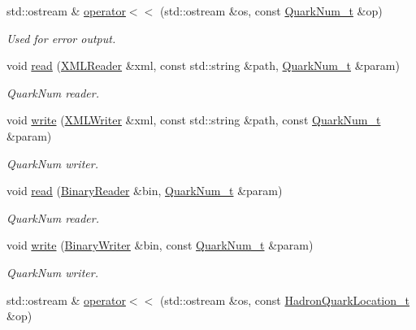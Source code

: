 \begin{DoxyCompactItemize}
\item 
std\+::ostream \& \mbox{\hyperlink{namespaceHadron_a99d886a5455746fba4c549c7a072c731}{operator$<$$<$}} (std\+::ostream \&os, const \mbox{\hyperlink{structHadron_1_1QuarkNum__t}{Quark\+Num\+\_\+t}} \&op)
\begin{DoxyCompactList}\small\item\em Used for error output. \end{DoxyCompactList}\item 
void \mbox{\hyperlink{namespaceHadron_a9fc0b61edf5216d1720dabf68810d3b5}{read}} (\mbox{\hyperlink{classADATXML_1_1XMLReader}{X\+M\+L\+Reader}} \&xml, const std\+::string \&path, \mbox{\hyperlink{structHadron_1_1QuarkNum__t}{Quark\+Num\+\_\+t}} \&param)
\begin{DoxyCompactList}\small\item\em Quark\+Num reader. \end{DoxyCompactList}\item 
void \mbox{\hyperlink{namespaceHadron_a7da51caa70247c9ab9d11f8275ec93b7}{write}} (\mbox{\hyperlink{classADATXML_1_1XMLWriter}{X\+M\+L\+Writer}} \&xml, const std\+::string \&path, const \mbox{\hyperlink{structHadron_1_1QuarkNum__t}{Quark\+Num\+\_\+t}} \&param)
\begin{DoxyCompactList}\small\item\em Quark\+Num writer. \end{DoxyCompactList}\item 
void \mbox{\hyperlink{namespaceHadron_a1f04a3926b07155fbf7e7887169d7f4e}{read}} (\mbox{\hyperlink{classADATIO_1_1BinaryReader}{Binary\+Reader}} \&bin, \mbox{\hyperlink{structHadron_1_1QuarkNum__t}{Quark\+Num\+\_\+t}} \&param)
\begin{DoxyCompactList}\small\item\em Quark\+Num reader. \end{DoxyCompactList}\item 
void \mbox{\hyperlink{namespaceHadron_a44eb64f50cbbc947364a538026c97ee6}{write}} (\mbox{\hyperlink{classADATIO_1_1BinaryWriter}{Binary\+Writer}} \&bin, const \mbox{\hyperlink{structHadron_1_1QuarkNum__t}{Quark\+Num\+\_\+t}} \&param)
\begin{DoxyCompactList}\small\item\em Quark\+Num writer. \end{DoxyCompactList}\item 
std\+::ostream \& \mbox{\hyperlink{namespaceHadron_a16e2cbe171cccf191439c38f7ce36655}{operator$<$$<$}} (std\+::ostream \&os, const \mbox{\hyperlink{structHadron_1_1HadronQuarkLocation__t}{Hadron\+Quark\+Location\+\_\+t}} \&op)

\end{DoxyCompactItemize}
